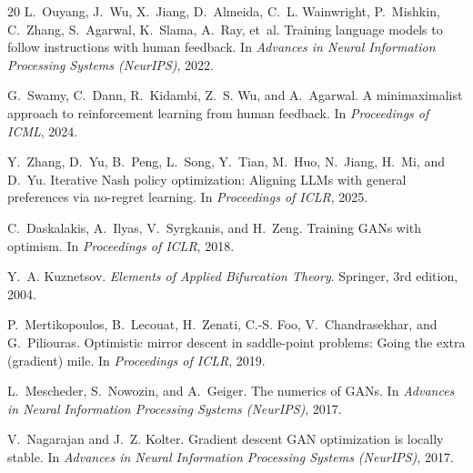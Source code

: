 \documentclass[10pt]{article}
\begin{document}
\begin{thebibliography}{20}
L.~Ouyang, J.~Wu, X.~Jiang, D.~Almeida, C.~L. Wainwright, P.~Mishkin, C.~Zhang, S.~Agarwal, K.~Slama, A.~Ray, et~al.
\newblock Training language models to follow instructions with human feedback.
\newblock In \emph{Advances in Neural Information Processing Systems (NeurIPS)}, 2022.

G.~Swamy, C.~Dann, R.~Kidambi, Z.~S. Wu, and A.~Agarwal.
\newblock A minimaximalist approach to reinforcement learning from human feedback.
\newblock In \emph{Proceedings of ICML}, 2024.

Y.~Zhang, D.~Yu, B.~Peng, L.~Song, Y.~Tian, M.~Huo, N.~Jiang, H.~Mi, and D.~Yu.
\newblock Iterative {N}ash policy optimization: Aligning {LLM}s with general preferences via no-regret learning.
\newblock In \emph{Proceedings of ICLR}, 2025.

C.~Daskalakis, A.~Ilyas, V.~Syrgkanis, and H.~Zeng.
\newblock Training {GAN}s with optimism.
\newblock In \emph{Proceedings of ICLR}, 2018.

Y.~A. Kuznetsov.
\newblock \emph{Elements of Applied Bifurcation Theory}.
\newblock Springer, 3rd edition, 2004.

P.~Mertikopoulos, B.~Lecouat, H.~Zenati, C.-S. Foo, V.~Chandrasekhar, and G.~Piliouras.
\newblock Optimistic mirror descent in saddle-point problems: Going the extra (gradient) mile.
\newblock In \emph{Proceedings of ICLR}, 2019.

L.~Mescheder, S.~Nowozin, and A.~Geiger.
\newblock The numerics of {GAN}s.
\newblock In \emph{Advances in Neural Information Processing Systems (NeurIPS)}, 2017.

V.~Nagarajan and J.~Z. Kolter.
\newblock Gradient descent {GAN} optimization is locally stable.
\newblock In \emph{Advances in Neural Information Processing Systems (NeurIPS)}, 2017.

\end{thebibliography}
\end{document}
